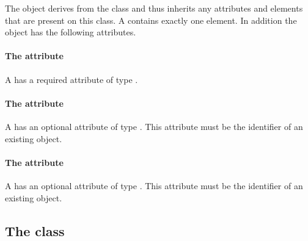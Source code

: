 The \CSGSetOperator object derives from the \CSGNode class and thus
inherits any attributes and elements that are present on this class.
A \CSGSetOperator contains exactly one \ListOfCsgNodes element.
In addition the \CSGSetOperator object has the following attributes.

\paragraph{The \fixttspace{} attribute}

A \CSGSetOperator has a required attribute  of type
.


\paragraph{The \fixttspace{} attribute}

A \CSGSetOperator has an optional attribute  of type
.
This attribute must be the identifier of an existing \CSGNode object.


\paragraph{The \fixttspace{} attribute}

A \CSGSetOperator has an optional attribute  of type
.
This attribute must be the identifier of an existing \CSGNode object.


\subsection{The  class}
\label{mixedgeometry-class}




